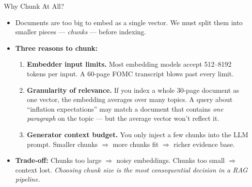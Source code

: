 \begin{frame}{Why Chunk At All?}
\begin{itemize}
\item Documents are too big to embed as a single vector. We must split them into smaller pieces --- \emph{chunks} --- before indexing.

\medskip
\item \textbf{Three reasons to chunk:}
\begin{enumerate}
    \item \textbf{Embedder input limits.} Most embedding models accept 512--8192 tokens per input. A 60-page FOMC transcript blows past every limit.
    \item \textbf{Granularity of relevance.} If you index a whole 30-page document as one vector, the embedding averages over many topics. A query about ``inflation expectations'' may match a document that contains \emph{one paragraph} on the topic --- but the average vector won't reflect it.
    \item \textbf{Generator context budget.} You only inject a few chunks into the LLM prompt. Smaller chunks $\Rightarrow$ more chunks fit $\Rightarrow$ richer evidence base.
\end{enumerate}

\medskip
\item \textbf{Trade-off:} Chunks too large $\Rightarrow$ noisy embeddings. Chunks too small $\Rightarrow$ context lost. \emph{Choosing chunk size is the most consequential decision in a RAG pipeline.}
\end{itemize}
\end{frame}

